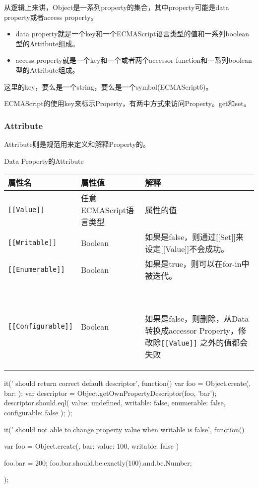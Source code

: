从逻辑上来讲，Object是一系列property的集合，其中property可能是data property或者access property。
\begin{itemize}
\item data property就是一个key和一个ECMAScript语言类型的值和一系列boolean型的Attribute组成。
\item access property就是一个key和一个或者两个accessor function和一系列boolean型的Attribute组成。
\end{itemize}	
这里的key，要么是一个string，要么是一个symbol(ECMAScript6)。

ECMAScript的使用key来标示Property，有两中方式来访问Property。get和set。

\subsubsection{Attribute}
Attribute则是规范用来定义和解释Property的。

Data Property的Attribute

\begin{tabular}{|l|l|l|}
\hline
属性名 & 属性值 & 解释 \\
\hline
\lstinline![[Value]]! & 任意ECMAScript语言类型 & 属性的值 \\
\hline
\lstinline![[Writable]]! & Boolean & 如果是false，则通过[[Set]]来设定[[Value]]不会成功。 \\
\hline
\lstinline![[Enumerable]]! & Boolean & 如果是true，则可以在for-in中被迭代。 \\
\hline
\lstinline![[Configurable]]! & Boolean &　\parbox[t]{8cm}{如果是false，则删除，从Data转换成accessor Property，修改除\lstinline![[Value]]! 之外的值都会失败}\\
\hline
\end{tabular}

\begin{JavaScript}
		it(' should return correct default descriptor', function(){
			var foo  = Object.create({}, {
				bar: {}
			});
			var descriptor = Object.getOwnPropertyDescriptor(foo, 'bar');
			descriptor.should.eql(
				{
					value: undefined, 
					writable: false, 
					enumerable: false, 
					configurable: false
				});
		});
\end{JavaScript}

\begin{JavaScript}
		it(' should not able to change property value when writable is false', function(){
			var foo = Object.create({}, {
				bar: {value: 100, writable: false}
			})

			foo.bar = 200;
			foo.bar.should.be.exactly(100).and.be.Number;
		});
\end{JavaScript}


